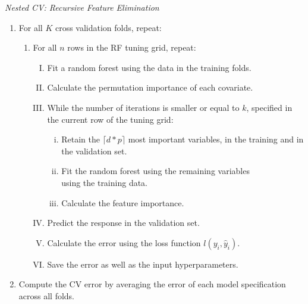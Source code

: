 \documentclass[a4paper,12pt, headsepline]{scrartcl}
\numberwithin{equation}{section}
\begin{document}
{\centering
	\begin{minipage}{.9\linewidth}
		\begin{algorithm}[H]
			\caption{\textit{Nested CV: Recursive Feature Elimination}}\label{alg:four}
			\begin{enumerate}
				\item For all $K$ cross validation folds, repeat:
				\begin{enumerate}
					\item For all $n$ rows in the RF tuning grid, repeat:
					\begin{enumerate}[I.]
						\item Fit a random forest using the data in the training folds.
						\item Calculate the permutation importance of each covariate.
						\item While the number of iterations is smaller or equal to $k$, specified in the current row of the tuning grid:
						\begin{enumerate}[i.]
							\item Retain the $\lceil d*p \rceil$ most important variables, in the training and in the validation set.
							\item Fit the random forest using the remaining variables\\ using the training data.
							\item Calculate the feature importance.
						\end{enumerate}
						\item Predict the response in the validation set.
						\item Calculate the error using the loss function $l(y_i, \hat y_i)$.
						\item Save the error as well as the input hyperparameters. 
					\end{enumerate} 
				\end{enumerate}
				\item Compute the CV error by averaging the error of each model specification across all folds.
			\end{enumerate}
		\end{algorithm}
	\end{minipage}
	\par
}
\end{document}
